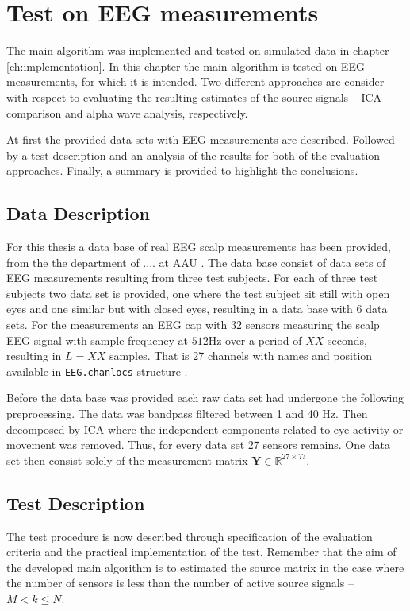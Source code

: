 \chapter{Test on EEG measurements}\label{ch:eeg_test}
The main algorithm was implemented and tested on simulated data in chapter \ref{ch:implementation}. 
In this chapter the main algorithm is tested on EEG measurements, for which it is intended. 
Two different approaches are consider with respect to evaluating the resulting estimates of the source signals -- ICA comparison and alpha wave analysis, respectively.

At first the provided data sets with EEG measurements are described. Followed by a test description and an analysis of the results for both of the evaluation approaches. 
Finally, a summary is provided to highlight the conclusions.  

\section{Data Description}
For this thesis a data base of real EEG scalp measurements has been provided, from the the department of .... at AAU . 
The data base consist of data sets of EEG measurements resulting from three test subjects. 
For each of three test subjects two data set is provided, one where the test subject sit still with open eyes and one similar but with closed eyes, resulting in a data base with 6 data sets.  
For the measurements an EEG cap with $32$ sensors measuring the scalp EEG signal with sample frequency at $512$Hz over a period of $XX$ seconds, resulting in $L = XX$ samples. 
That is 27 channels with names and position available in \texttt{EEG.chanlocs} structure .   

Before the data base was provided each raw data set had undergone the following preprocessing.
The data was bandpass filtered between 1 and 40 Hz. Then decomposed by ICA where the independent components related to eye activity or movement was removed. Thus, for every data set 27 sensors remains. One data set then consist solely of the measurement matrix $\mathbf{Y} \in \mathbb{R}^{27\times ??}$.


\section{Test Description}
The test procedure is now described through specification of the evaluation criteria and the practical implementation of the test.
Remember that the aim of the developed main algorithm is to estimated the source matrix in the case where the number of sensors is less than the number of active source signals -- $M<k\leq N$.

